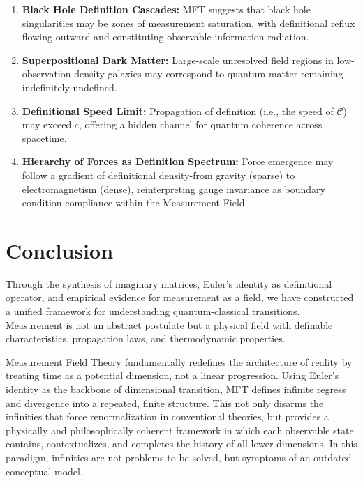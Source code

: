 \begin{enumerate}
  \item \textbf{Black Hole Definition Cascades:} MFT suggests that black hole singularities may be zones of measurement saturation, with definitional reflux flowing outward and constituting observable information radiation.

  \item \textbf{Superpositional Dark Matter:} Large-scale unresolved field regions in low-observation-density galaxies may correspond to quantum matter remaining indefinitely undefined.

  \item \textbf{Definitional Speed Limit:} Propagation of definition (i.e., the speed of \(\mathcal{C}\)) may exceed \(c\), offering a hidden channel for quantum coherence across spacetime.

  \item \textbf{Hierarchy of Forces as Definition Spectrum:} Force emergence may follow a gradient of definitional density-from gravity (sparse) to electromagnetism (dense), reinterpreting gauge invariance as boundary condition compliance within the Measurement Field.
\end{enumerate}



\section{Conclusion}

Through the synthesis of imaginary matrices, Euler's identity as definitional operator, and empirical evidence for measurement as a field, we have constructed a unified framework for understanding quantum-classical transitions. Measurement is not an abstract postulate but a physical field with definable characteristics, propagation laws, and thermodynamic properties.

Measurement Field Theory fundamentally redefines the architecture of reality by treating time as a potential dimension, not a linear progression. Using Euler's identity as the backbone of dimensional transition, MFT defines infinite regress and divergence into a repeated, finite structure. This not only disarms the infinities that force renormalization in conventional theories, but provides a physically and philosophically coherent framework in which each observable state contains, contextualizes, and completes the history of all lower dimensions. In this paradigm, infinities are not problems to be solved, but symptoms of an outdated conceptual model.

